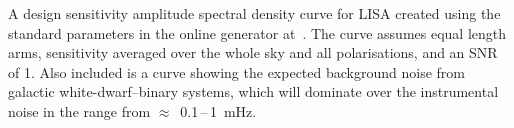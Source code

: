 \label{fig:lisasens}
A design sensitivity amplitude spectral density curve for LISA
created using the standard parameters in the online generator
at~\cite{lisasens}. The curve assumes equal length arms, sensitivity
averaged over the whole sky and all polarisations, and an SNR of
1. Also included is a curve showing the expected background noise from
galactic white-dwarf--binary systems, which will dominate over the
instrumental noise in the range from $\approx$~0.1\,--\,1~mHz.
